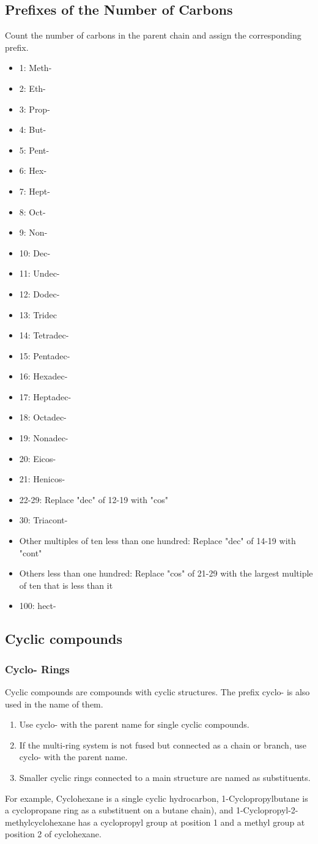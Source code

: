\documentclass[a4paper,12pt]{report}
\begin{document}
\subsection{Prefixes of the Number of Carbons}
Count the number of carbons in the parent chain and assign the corresponding prefix.
\begin{itemize}
\item 1: Meth-
\item 2: Eth-
\item 3: Prop-
\item 4: But-
\item 5: Pent-
\item 6: Hex-
\item 7: Hept-
\item 8: Oct-
\item 9: Non-
\item 10: Dec-
\item 11: Undec-
\item 12: Dodec-
\item 13: Tridec
\item 14: Tetradec-
\item 15: Pentadec-
\item 16: Hexadec-
\item 17: Heptadec-
\item 18: Octadec-
\item 19: Nonadec-
\item 20: Eicos-
\item 21: Henicos-
\item 22-29: Replace "dec" of 12-19 with "cos"
\item 30: Triacont-
\item Other multiples of ten less than one hundred: Replace "dec" of 14-19 with "cont"
\item Others less than one hundred: Replace "cos" of 21-29 with the largest multiple of ten that is less than it
\item 100: hect-
\end{itemize}
\subsection{Cyclic compounds}
\subsubsection{Cyclo- Rings}
Cyclic compounds are compounds with cyclic structures. The prefix cyclo- is also used in the name of them.
\begin{enumerate}
\item Use cyclo- with the parent name for single cyclic compounds.
\item If the multi-ring system is not fused but connected as a chain or branch, use cyclo- with the parent name.
\item Smaller cyclic rings connected to a main structure are named as substituents.
\end{enumerate}
For example, Cyclohexane is a single cyclic hydrocarbon, 1-Cyclopropylbutane is a cyclopropane ring as a substituent on a butane chain), and 1-Cyclopropyl-2-methylcyclohexane has a cyclopropyl group at position 1 and a methyl group at position 2 of cyclohexane.
\end{document}
